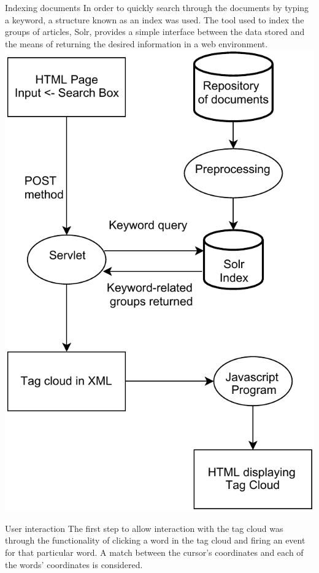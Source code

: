 \documentclass[a0paper, portrait]{baposter}
\begin{document}
\begin{poster}
  \begin{posterbox}[column=1, name=index, below=semantic]{Indexing documents} {
    In order to quickly search through the documents by typing a keyword, a structure known as an index was used. The tool used to index the groups of articles, Solr, provides a simple interface between the data stored and the means of returning the desired information in a web environment. \\[3ex]
    \includegraphics[width=\linewidth]{arch.pdf}
    \label{fig:4}
    }
  \end{posterbox}

  \begin{posterbox}[name=interact, column=2, row=0]{User interaction} {
    The first step to allow interaction with the tag cloud was through the functionality of clicking a word in the tag cloud and firing an event for that particular word. A match between the cursor's coordinates \cite{Lopez} and each of the words' coordinates is considered. %
  }
  \end{posterbox}


\end{poster}
\end{document}
